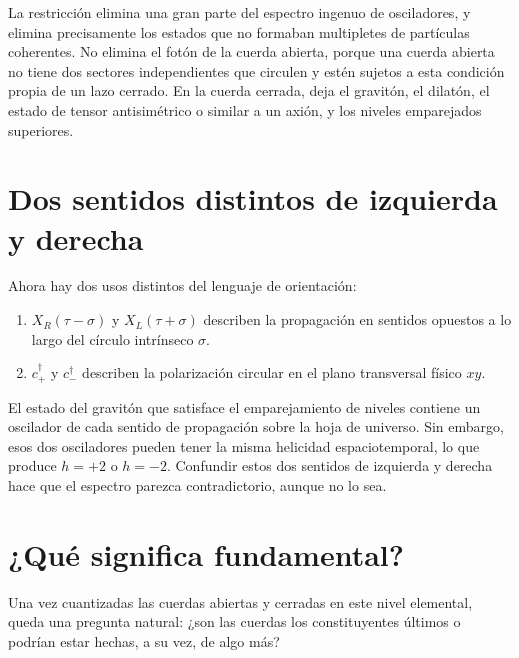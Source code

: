 La restricción elimina una gran parte del espectro ingenuo de osciladores, y elimina precisamente los estados que no formaban multipletes de partículas coherentes. No elimina el fotón de la cuerda abierta, porque una cuerda abierta no tiene dos sectores independientes que circulen y estén sujetos a esta condición propia de un lazo cerrado. En la cuerda cerrada, deja el gravitón, el dilatón, el estado de tensor antisimétrico o similar a un axión, y los niveles emparejados superiores.

\section{Dos sentidos distintos de izquierda y derecha}

Ahora hay dos usos distintos del lenguaje de orientación:
\begin{enumerate}
  \item \(X_R(\tau-\sigma)\) y \(X_L(\tau+\sigma)\) describen la propagación en sentidos opuestos a lo largo del círculo intrínseco \(\sigma\).
  \item \(c_+^\dagger\) y \(c_-^\dagger\) describen la polarización circular en el plano transversal físico \(xy\).
\end{enumerate}
El estado del gravitón que satisface el emparejamiento de niveles contiene un oscilador de cada sentido de propagación sobre la hoja de universo. Sin embargo, esos dos osciladores pueden tener la misma helicidad espaciotemporal, lo que produce \(h=+2\) o \(h=-2\). Confundir estos dos sentidos de izquierda y derecha hace que el espectro parezca contradictorio, aunque no lo sea.

\section{¿Qué significa fundamental?}

Una vez cuantizadas las cuerdas abiertas y cerradas en este nivel elemental, queda una pregunta natural: ¿son las cuerdas los constituyentes últimos o podrían estar hechas, a su vez, de algo más?

\begin{classroomqa}
\end{classroomqa}

